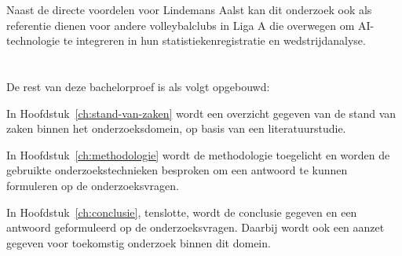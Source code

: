Naast de directe voordelen voor Lindemans Aalst kan dit onderzoek ook als referentie dienen voor andere volleybalclubs in Liga A die overwegen om AI-technologie te integreren in hun statistiekenregistratie en wedstrijdanalyse.

\section{}%
\label{sec:opzet-bachelorproef}


De rest van deze bachelorproef is als volgt opgebouwd:

In Hoofdstuk~\ref{ch:stand-van-zaken} wordt een overzicht gegeven van de stand van zaken binnen het onderzoeksdomein, op basis van een literatuurstudie.

In Hoofdstuk~\ref{ch:methodologie} wordt de methodologie toegelicht en worden de gebruikte onderzoekstechnieken besproken om een antwoord te kunnen formuleren op de onderzoeksvragen.


In Hoofdstuk~\ref{ch:conclusie}, tenslotte, wordt de conclusie gegeven en een antwoord geformuleerd op de onderzoeksvragen. Daarbij wordt ook een aanzet gegeven voor toekomstig onderzoek binnen dit domein.